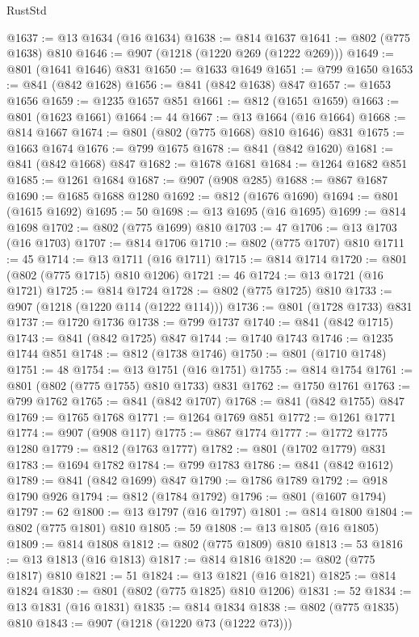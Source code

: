 \begin{lexlean}{RustStd}
\begin{coremodule}
{\begin{coremodule}
{{{{{@1637 := @13 @1634 (@16 @1634)
@1638 := @814 @1637
@1641 := @802 (@775 @1638) @810
@1646 := @907 (@1218 (@1220 @269 (@1222 @269)))
@1649 := @801 (@1641 @1646) @831
@1650 := @1633 @1649
@1651 := @799 @1650
@1653 := @841 (@842 @1628)
@1656 := @841 (@842 @1638) @847
@1657 := @1653 @1656
@1659 := @1235 @1657 @851
@1661 := @812 (@1651 @1659)
@1663 := @801 (@1623 @1661)
@1664 := 44
@1667 := @13 @1664 (@16 @1664)
@1668 := @814 @1667
@1674 := @801 (@802 (@775 @1668) @810 @1646) @831
@1675 := @1663 @1674
@1676 := @799 @1675
@1678 := @841 (@842 @1620)
@1681 := @841 (@842 @1668) @847
@1682 := @1678 @1681
@1684 := @1264 @1682 @851
@1685 := @1261 @1684
@1687 := @907 (@908 @285)
@1688 := @867 @1687
@1690 := @1685 @1688 @1280
@1692 := @812 (@1676 @1690)
@1694 := @801 (@1615 @1692)
@1695 := 50
@1698 := @13 @1695 (@16 @1695)
@1699 := @814 @1698
@1702 := @802 (@775 @1699) @810
@1703 := 47
@1706 := @13 @1703 (@16 @1703)
@1707 := @814 @1706
@1710 := @802 (@775 @1707) @810
@1711 := 45
@1714 := @13 @1711 (@16 @1711)
@1715 := @814 @1714
@1720 := @801 (@802 (@775 @1715) @810 @1206)
@1721 := 46
@1724 := @13 @1721 (@16 @1721)
@1725 := @814 @1724
@1728 := @802 (@775 @1725) @810
@1733 := @907 (@1218 (@1220 @114 (@1222 @114)))
@1736 := @801 (@1728 @1733) @831
@1737 := @1720 @1736
@1738 := @799 @1737
@1740 := @841 (@842 @1715)
@1743 := @841 (@842 @1725) @847
@1744 := @1740 @1743
@1746 := @1235 @1744 @851
@1748 := @812 (@1738 @1746)
@1750 := @801 (@1710 @1748)
@1751 := 48
@1754 := @13 @1751 (@16 @1751)
@1755 := @814 @1754
@1761 := @801 (@802 (@775 @1755) @810 @1733) @831
@1762 := @1750 @1761
@1763 := @799 @1762
@1765 := @841 (@842 @1707)
@1768 := @841 (@842 @1755) @847
@1769 := @1765 @1768
@1771 := @1264 @1769 @851
@1772 := @1261 @1771
@1774 := @907 (@908 @117)
@1775 := @867 @1774
@1777 := @1772 @1775 @1280
@1779 := @812 (@1763 @1777)
@1782 := @801 (@1702 @1779) @831
@1783 := @1694 @1782
@1784 := @799 @1783
@1786 := @841 (@842 @1612)
@1789 := @841 (@842 @1699) @847
@1790 := @1786 @1789
@1792 := @918 @1790 @926
@1794 := @812 (@1784 @1792)
@1796 := @801 (@1607 @1794)
@1797 := 62
@1800 := @13 @1797 (@16 @1797)
@1801 := @814 @1800
@1804 := @802 (@775 @1801) @810
@1805 := 59
@1808 := @13 @1805 (@16 @1805)
@1809 := @814 @1808
@1812 := @802 (@775 @1809) @810
@1813 := 53
@1816 := @13 @1813 (@16 @1813)
@1817 := @814 @1816
@1820 := @802 (@775 @1817) @810
@1821 := 51
@1824 := @13 @1821 (@16 @1821)
@1825 := @814 @1824
@1830 := @801 (@802 (@775 @1825) @810 @1206)
@1831 := 52
@1834 := @13 @1831 (@16 @1831)
@1835 := @814 @1834
@1838 := @802 (@775 @1835) @810
@1843 := @907 (@1218 (@1220 @73 (@1222 @73)))
}}}}}
\end{coremodule}}
\end{coremodule}
\end{lexlean}
